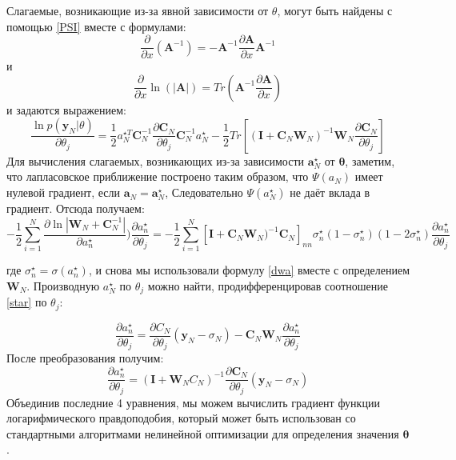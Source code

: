 {Слагаемые, возникающие из-за явной зависимости от $\theta$, могут быть найдены с помощью \ref{PSI} вместе с формулами:
\begin{equation}
    \label{odin}
    \frac{\partial}{\partial x}(\mathbf{A}^{-1})=-\mathbf{A}^{-1}\frac{\partial \mathbf{A}}{\partial x}\mathbf{A}^{-1}
\end{equation}
и
\begin{equation}
    \label{dwa}
    \frac{\partial}{\partial x}\ln(|\mathbf{A}|)=Tr(\mathbf{A}^{-1}\frac{\partial \mathbf{A}}{\partial x})
\end{equation}
и задаются выражением:
\[
    \label{urav1}
    \frac{\ln p(\mathbf{y}_N|\theta)}{\partial \theta_j} = \frac{1}{2}a_N^{\star T}\mathbf{C}_N^{-1}\frac{\partial \mathbf{C}_N}{\partial \theta_j}\mathbf{C}_N^{-1}a_N^{\star} - \frac{1}{2}Tr[(\mathbf{I} + \mathbf{C}_N\mathbf{W}_N)^{-1}\mathbf{W}_N\frac{\partial \mathbf{C}_N}{\partial \theta_j}]
\]
Для вычисления слагаемых, возникающих из-за зависимости $\mathbf{a}_N^{\star}$ от $\mathbf{\theta}$, заметим, что лапласовское приближение построено таким образом, что $\Psi(a_N)$ имеет нулевой градиент, если $\mathbf{a}_N=\mathbf{a}_N^{\star}$, Следовательно $\Psi(a_N^{\star})$ не даёт вклада в градиент. Отсюда получаем:
\[
    \label{urav2}
    -\frac{1}{2} \displaystyle \sum_{i=1}^{N} \frac{\partial \ln|\mathbf{W}_N + \mathbf{C}_N^{-1}|}{\partial a_n^{\star}})\frac{\partial a_n^{\star}}{\partial \theta_j} = -\frac{1}{2} \displaystyle \sum_{i=1}^N [\mathbf{I} + \mathbf{C}_N\mathbf{W}_N)^{-1}\mathbf{C}_N]_{nn} \sigma_{n}^{\star}(1-\sigma_{n}^{\star})(1-2\sigma_{n}^{\star})\frac{\partial a_n^{\star}}{\partial \theta_j}
\]

где $\sigma_n^{\star}= \sigma(a_n^{\star})$, и снова мы использовали формулу \ref{dwa} вместе с определением $\mathbf{W}_N$. Производную $a_N^{\star}$ по $\theta_j$ можно найти, продифференцировав соотношение \ref{star} по $\theta_j$:

\[
    \frac{\partial a_n^{\star}}{\partial \theta_j} = \frac{\partial C_N}{\partial \theta_j} (\mathbf{y}_N-\sigma_N)-\mathbf{C}_N \mathbf{W}_N \frac{\partial a_n^{\star}}{\partial \theta_j}
\]
После преобразования получим:
\[
    \label{urav3}
    \frac{\partial a_n^{\star}}{\partial \theta_j} = (\mathbf{I} + \mathbf{W}_NC_N)^{-1} \frac{\partial \mathbf{C}_N}{\partial \theta_j} (\mathbf{y}_N-\sigma_N)
\]
Объединив последние 4 уравнения, мы можем вычислить градиент функции логарифмического правдоподобия, который может быть использован со стандартными алгоритмами нелинейной оптимизации для определения значения $\mathbf{\theta}$.

}
